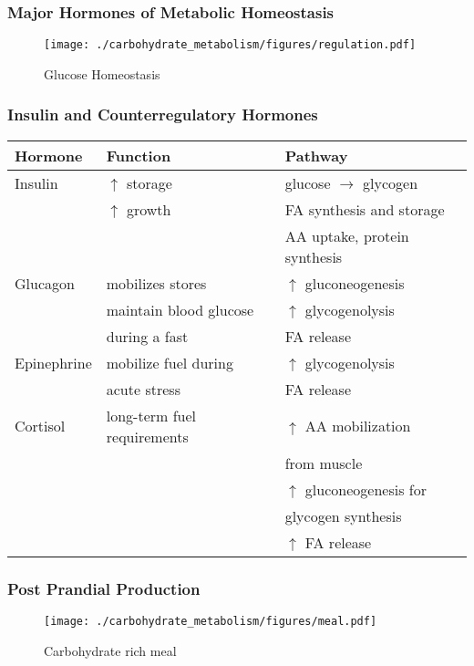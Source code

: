 \documentclass{scrartcl}
\begin{document}
\subsubsection{Major Hormones of Metabolic Homeostasis}
\label{sec:org829b21b}
\begin{figure}[htbp]
\centering
\texttt{[image: ./carbohydrate\_metabolism/figures/regulation.pdf]}
\caption{\label{fig:orgb288750}
Glucose Homeostasis}
\end{figure}

\subsubsection{Insulin and Counterregulatory Hormones}
\label{sec:orgc2932c2}

\begin{center}
\begin{tabular}{lll}
Hormone & Function & Pathway\\
\hline
Insulin & \(\uparrow\) storage & glucose \(\to\) glycogen\\
 & \(\uparrow\) growth & FA synthesis and storage\\
 &  & AA uptake, protein synthesis\\
\hline
Glucagon & mobilizes stores & \(\uparrow\) gluconeogenesis\\
 & maintain blood glucose & \(\uparrow\) glycogenolysis\\
 & during a fast & FA release\\
\hline
Epinephrine & mobilize fuel during & \(\uparrow\) glycogenolysis\\
 & acute stress & FA release\\
\hline
Cortisol & long-term fuel requirements & \(\uparrow\) AA mobilization\\
 &  & from muscle\\
 &  & \(\uparrow\) gluconeogenesis for\\
 &  & glycogen synthesis\\
 &  & \(\uparrow\) FA release\\
\end{tabular}
\end{center}

\subsubsection{Post Prandial Production}
\label{sec:org1782233}

\begin{figure}[htbp]
\centering
\texttt{[image: ./carbohydrate\_metabolism/figures/meal.pdf]}
\caption{\label{fig:orgca92dc3}
Carbohydrate rich meal}
\end{figure}
\end{document}
